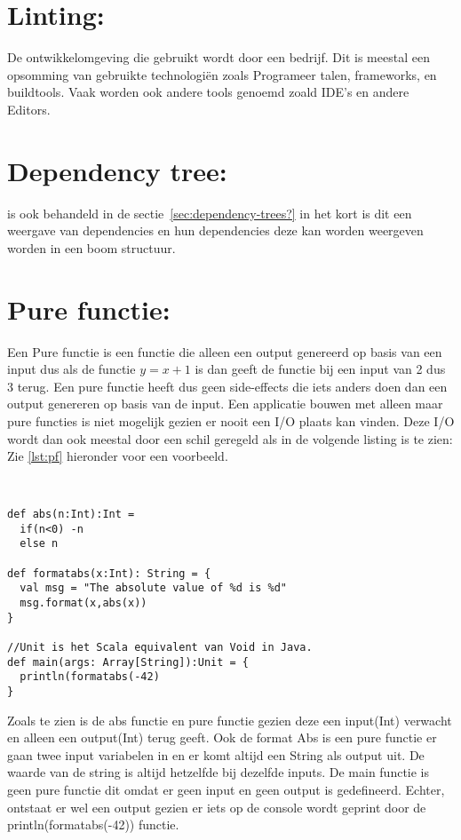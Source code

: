 \section{Linting:}\label{sec:linting:} De ontwikkelomgeving die gebruikt wordt door een bedrijf. Dit is meestal een opsomming van gebruikte technologiën zoals Programeer talen, frameworks, en buildtools. Vaak worden ook andere tools genoemd zoald IDE's en andere Editors.
\smallskip




\section{Dependency tree:}\label{sec:dependency-tree:} is ook behandeld in de sectie~\ref{sec:dependency-trees?} in het kort is dit een weergave van dependencies en hun dependencies deze kan worden weergeven worden in een boom structuur.
\smallskip

\section{Pure functie:}\label{sec:pure-functie:}
Een Pure functie is een functie die alleen een output genereerd op basis van een input dus als de functie \( y = x+1\) is dan geeft de functie bij een input van 2 dus 3 terug.
Een pure functie heeft dus geen side-effects die iets anders doen dan een output genereren op basis van de input.
Een applicatie bouwen met alleen maar pure functies is niet mogelijk gezien er nooit een I/O plaats kan vinden.
Deze I/O wordt dan ook meestal door een schil geregeld als in de volgende listing is te zien:
Zie \autoref{lst:pf} hieronder voor een voorbeeld.

\begin{lstlisting}[caption={Pure functie met IO},label=lst:pf]


def abs(n:Int):Int =
  if(n<0) -n
  else n

def formatabs(x:Int): String = {
  val msg = "The absolute value of %d is %d"
  msg.format(x,abs(x))
}

//Unit is het Scala equivalent van Void in Java.
def main(args: Array[String]):Unit = {
  println(formatabs(-42)
}
\end{lstlisting}

Zoals te zien is de abs functie en pure functie gezien deze een input(Int) verwacht en alleen een output(Int) terug geeft.
Ook de format Abs is een pure functie er gaan twee input variabelen in en er komt altijd een String als output uit.
De waarde van de string is altijd hetzelfde bij dezelfde inputs.
De main functie is geen pure functie dit omdat er geen input en geen output is gedefineerd.
Echter, ontstaat er wel een output gezien er iets op de console wordt geprint door de println(formatabs(-42)) functie.
\smallskip

